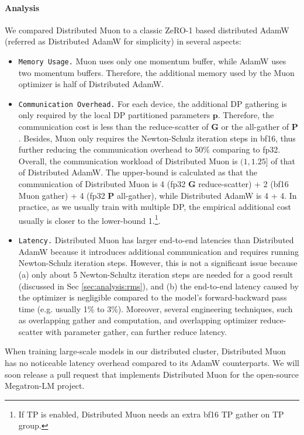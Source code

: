 \paragraph{Analysis}
We compared Distributed Muon to a classic ZeRO-1 based distributed AdamW (referred as Distributed AdamW for simplicity) in several aspects:

\begin{itemize}
\item \texttt{Memory Usage.} Muon uses only one momentum buffer, while AdamW uses two momentum buffers. Therefore, the additional memory used by the Muon optimizer is half of Distributed AdamW.

\item \texttt{Communication Overhead.} For each device, the additional DP gathering is only required by the local DP partitioned parameters $\mathbf{p}$. Therefore, the communication cost is less than the reduce-scatter of $\mathbf{G}$ or the all-gather of $\mathbf{P}$. Besides, Muon only requires the Newton-Schulz iteration steps in bf16, thus further reducing the communication overhead to 50\% comparing to fp32. Overall, the communication workload of Distributed Muon is $(1, 1.25]$ of that of Distributed AdamW. The upper-bound is calculated as that the communication of Distributed Muon is 4 (fp32 $\mathbf{G}$ reduce-scatter) + 2 (bf16 Muon gather) + 4 (fp32 $\mathbf{P}$ all-gather), while Distributed AdamW is 4 + 4. In practice, as we usually train with multiple DP, the empirical additional cost usually is closer to the lower-bound 1.\footnote{If TP is enabled, Distributed Muon needs an extra bf16 TP gather on TP group.}.

\item \texttt{Latency.} Distributed Muon has larger end-to-end latencies than Distributed AdamW because it introduces additional communication and requires running Newton-Schulz iteration steps. However, this is not a significant issue because (a) only about 5 Newton-Schultz iteration steps are needed for a good result (discussed in Sec \ref{sec:analysis:rms}), and (b) the end-to-end latency caused by the optimizer is negligible compared to the model's forward-backward pass time (e.g. usually 1\% to 3\%). Moreover, several engineering techniques, such as overlapping gather and computation, and overlapping optimizer reduce-scatter with parameter gather, can further reduce latency.


\end{itemize}

When training large-scale models in our distributed cluster, Distributed Muon has no noticeable latency overhead compared to its AdamW counterparts. We will soon release a pull request that implements Distributed Muon for the open-source Megatron-LM \citep{shoeybi2020megatronlmtrainingmultibillionparameter} project.

